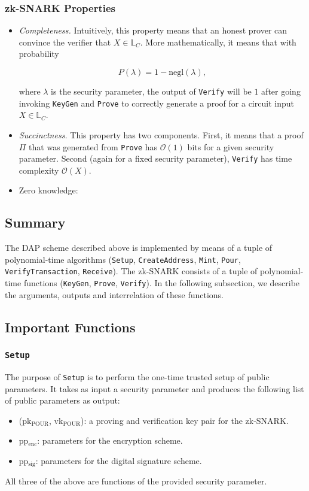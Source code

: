 \documentclass{article}
\begin{document}
\subsubsection{zk-SNARK Properties}
\begin{itemize}
\item \emph{Completeness.} Intuitively, this property means that an honest prover can convince the verifier that $X \in \mathbb{L}_C$. More mathematically, it means that with probability

\begin{equation}
P(\lambda) = 1 - \text{negl}(\lambda),
\end{equation}

where $\lambda$ is the security parameter, the output of \texttt{Verify} will be $1$ after going invoking \texttt{KeyGen} and \texttt{Prove} to correctly generate a proof for a circuit input $X \in \mathbb{L}_C$.

\item \emph{Succinctness.} This property has two components. First, it means that a proof $\Pi$ that was generated from \texttt{Prove} has $\mathcal{O}(1)$ bits for a given security parameter. Second (again for a fixed security parameter), \texttt{Verify} has time complexity $\mathcal{O}(X)$.

\item Zero knowledge:
\end{itemize}

\subsection{Summary}

The DAP scheme described above is implemented by means of a tuple of polynomial-time algorithms (\texttt{Setup}, \texttt{CreateAddress}, \texttt{Mint}, \texttt{Pour}, \texttt{VerifyTransaction}, \texttt{Receive}). The zk-SNARK consists of a tuple of polynomial-time functions (\texttt{KeyGen}, \texttt{Prove}, \texttt{Verify}). In the following subsection, we describe the arguments, outputs and interrelation of these functions.

\subsection{Important Functions}

\subsubsection{\texttt{Setup}}
The purpose of \texttt{Setup} is to perform the one-time trusted setup of public parameters. It takes as input a security parameter and produces the following list of public parameters as output:
\begin{itemize}
\item (pk$_{\text{POUR}}$, vk$_{\text{POUR}}$): a proving and verification key pair for the zk-SNARK.
\item pp$_{\text{enc}}$: parameters for the encryption scheme.
\item pp$_{\text{sig}}$: parameters for the digital signature scheme.
\end{itemize}
All three of the above are functions of the provided security parameter.
\end{document}
